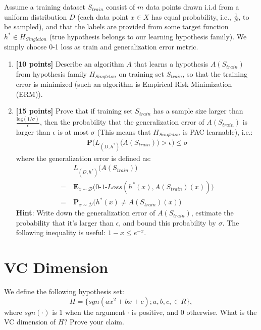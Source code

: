 \documentclass[11pt]{article}
\begin{document}
Assume a training dataset $S_{train}$ consist of $m$ data points drawn i.i.d from a uniform distribution $D$ (each data point $x \in X$ has equal probability, i.e., $\frac{1}{N}$, to be sampled), and that the labels are provided from some target function $h^* \in H_{Singleton}$ (true hypothesis belongs to our learning hypothesis family). We simply choose 0-1 loss as train and generalization error metric.
\begin{enumerate}
\item {\bf [10 points]} Describe an algorithm $A$ that learns a hypothesis $A(S_{train})$ from hypothesis family $H_{Singleton}$ on training set $S_{train}$, so that the training error is minimized (such an algorithm is Empirical Risk Minimization (ERM)).
\item {\bf [15 points]} Prove that if training set $S_{train}$ has a sample size larger than $\frac{\text{log}(1/\sigma)}{\epsilon}$, then the probability that the generalization error of $A(S_{train})$ is larger than $\epsilon$ is at most $\sigma$ (This means that $H_{Singleton}$ is PAC learnable),
i.e.:
\begin{align}
    \mathbf{P}\Big(L_{(D,h^*)}\big(A(S_{train})\big)  > \epsilon \Big) \leq \sigma
\end{align}
where the generalization error is defined as:
\begin{align}
      &L_{(D,h^*)}\big(A(S_{train})\big) \\
    =\ &\mathbf{E}_{x \sim \mathcal{D}} \Big(\text{0-1-} Loss(h^*(x), A(S_{train})(x))\Big) \\
    =\ &\mathbf{P}_{x \sim \mathcal{D}}\Big(h^*(x) \neq A(S_{train})(x)\Big)
\end{align}
\textbf{Hint}: Write down the generalization error of $A(S_{train})$, estimate the probability that it's larger than $\epsilon$, and bound this probability by $\sigma$. The following inequality is useful: $1-x \leq e^{-x}$.


\end{enumerate}
\solution{
}



\section{VC Dimension }

We define the following hypothesis set:
$$H = \{sgn(ax^2 +bx+c); a, b, c,\in R\},$$
where $sgn(\cdot)$ is $1$ when the argument $\cdot$ is positive, 
and $0$ otherwise.
\noindent
What is the VC dimension of $H$? Prove your claim.
\end{document}

